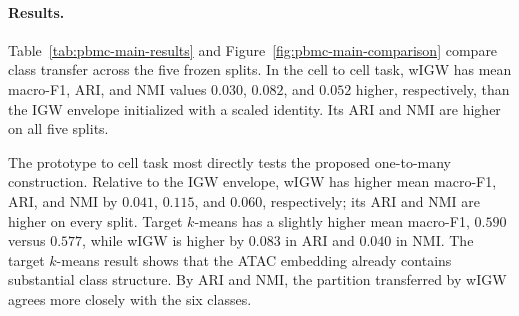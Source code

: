 \documentclass[11pt]{article}
\theoremstyle{plain}
\theoremstyle{definition}
\theoremstyle{remark}
\begin{document}
\paragraph{Results.}
Table~\ref{tab:pbmc-main-results} and Figure~\ref{fig:pbmc-main-comparison}
compare class transfer across the five frozen splits. In the cell to cell task,
wIGW has mean macro-F1, ARI, and NMI values \(0.030\), \(0.082\), and \(0.052\)
higher, respectively, than the IGW envelope initialized with a scaled identity.
Its ARI and NMI are higher on all five splits.

The prototype to cell task most directly tests the proposed one-to-many construction.
Relative to the IGW envelope, wIGW has higher mean macro-F1, ARI, and NMI by
\(0.041\), \(0.115\), and \(0.060\), respectively; its ARI and NMI are higher on every
split. Target \(k\)-means has a slightly higher mean macro-F1, \(0.590\) versus
\(0.577\), while wIGW is higher by \(0.083\) in ARI and \(0.040\) in NMI. The target
\(k\)-means result shows that the ATAC embedding already contains substantial class
structure. By ARI and NMI, the partition transferred by wIGW agrees more closely
with the six classes.
\end{document}
